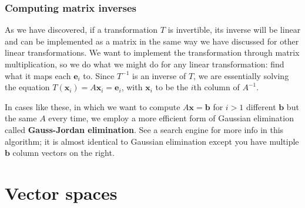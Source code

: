 \documentclass[draft,12pt]{report}
\renewcommand{\vec}[1]{\mathbf{#1}}
\begin{document}
\subsection{Computing matrix inverses}

As we have discovered, if a transformation $T$ is invertible, its inverse will be linear and can be implemented as a matrix in the same way we have discussed for other linear transformations. We want to implement the transformation through matrix multiplication, so we do what we might do for any linear transformation: find what it maps each $\vec{e}_i$ to. Since $T^{-1}$ is an inverse of $T$, we are essentially solving the equation $T(\vec{x}_i) = A\vec{x}_i = \vec{e}_i$, with $\vec{x}_i$ to be the $i$th column of $A^{-1}$.

In cases like these, in which we want to compute $A\vec{x} = \vec{b}$ for $i > 1$ different $\vec{b}$ but the same $A$ every time, we employ a more efficient form of Gaussian elimination called \textbf{Gauss-Jordan elimination}. See a search engine for more info in this algorithm; it is almost identical to Gaussian elimination except you have multiple $\vec{b}$ column vectors on the right.

\chapter{Vector spaces}
\end{document}
